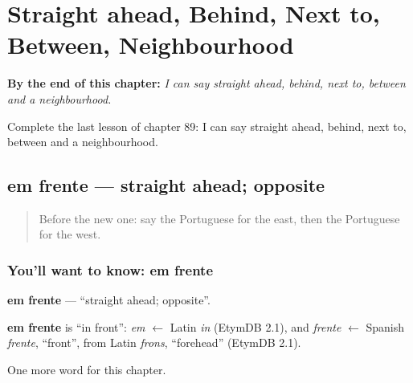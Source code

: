 
\chapter{Straight ahead, Behind, Next to, Between, Neighbourhood}
\label{ch:pt-straight-ahead-behind-next-to-between-neighbourhood}

\begin{chapteropening}
\textbf{By the end of this chapter:} \emph{I can say straight ahead, behind, next to, between and a neighbourhood.}

Complete the last lesson of chapter 89: I can say straight ahead, behind, next to, between and a neighbourhood.
\end{chapteropening}

\section[em frente]{em frente — straight ahead; opposite}

\label{lesson:PT-C89-em-frente}



\begin{quote}
Before the new one: say the Portuguese for the east, then the Portuguese for the west.
\end{quote}

\subsection*{You'll want to know: em frente}
\textbf{em frente} — \textquotedblleft{}straight ahead; opposite\textquotedblright{}.

\begin{cousinweb}
\textbf{em frente} is \textquotedblleft{}in front\textquotedblright{}: \emph{em} $\leftarrow$ Latin \emph{in} (EtymDB 2.1), and \emph{frente} $\leftarrow$ Spanish \emph{frente}, \textquotedblleft{}front\textquotedblright{}, from Latin \emph{frons}, \textquotedblleft{}forehead\textquotedblright{} (EtymDB 2.1).
\end{cousinweb}

\begin{grammarlens}[title={What you've built}]
One more word for this chapter.
\end{grammarlens}

